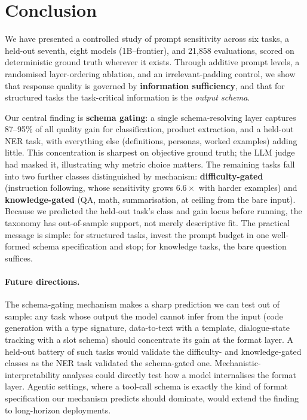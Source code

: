 \section{Conclusion}
\label{sec:conclusion}

We have presented a controlled study of prompt sensitivity across six tasks, a
held-out seventh, eight models (1B--frontier), and 21,858 evaluations, scored
on deterministic ground truth wherever it exists.
Through additive prompt levels, a randomised layer-ordering ablation, and an
irrelevant-padding control, we show that response quality is governed by
\textbf{information sufficiency}, and that for structured tasks the
task-critical information is the \emph{output schema}.

Our central finding is \textbf{schema gating}: a single schema-resolving layer
captures 87--95\% of all quality gain for classification, product extraction,
and a held-out NER task, with everything else (definitions, personas, worked
examples) adding little.
This concentration is sharpest on objective ground truth; the LLM judge had
masked it, illustrating why metric choice matters.
The remaining tasks fall into two further classes distinguished by mechanism:
\textbf{difficulty-gated} (instruction following, whose sensitivity grows
$6.6\times$ with harder examples) and \textbf{knowledge-gated} (QA, math,
summarisation, at ceiling from the bare input).
Because we predicted the held-out task's class and gain locus before running,
the taxonomy has out-of-sample support, not merely descriptive fit.
The practical message is simple: for structured tasks, invest the prompt budget
in one well-formed schema specification and stop; for knowledge tasks, the bare
question suffices.

\paragraph{Future directions.}
The schema-gating mechanism makes a sharp prediction we can test out of sample:
any task whose output the model cannot infer from the input (code generation
with a type signature, data-to-text with a template, dialogue-state tracking
with a slot schema) should concentrate its gain at the format layer.
A held-out battery of such tasks would validate the difficulty- and
knowledge-gated classes as the NER task validated the schema-gated one.
Mechanistic-interpretability analyses could directly test how a model
internalises the format layer. Agentic settings, where a tool-call schema is
exactly the kind of format specification our mechanism predicts should
dominate, would extend the finding to long-horizon deployments.
